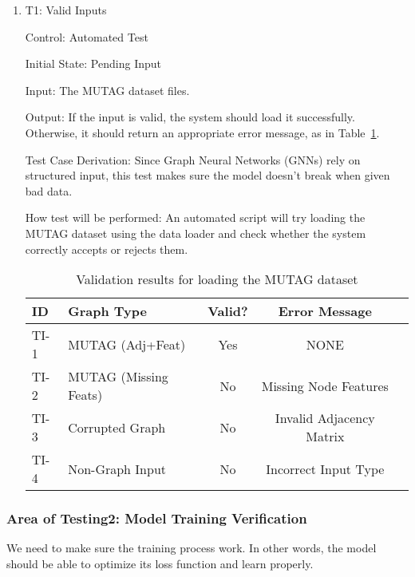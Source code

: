 \documentclass[12pt, titlepage]{article}
\begin{document}
\begin{enumerate}


\item{T1: Valid Inputs\\}

Control: Automated Test
					
Initial State: Pending Input
					
Input: The MUTAG dataset files.
					
Output:  If the input is valid, the system should load it successfully. Otherwise, it should return an appropriate error message, as in Table~\ref{tab:graph_validation}.
					
Test Case Derivation: Since Graph Neural Networks (GNNs) rely on structured input, this test makes sure the model doesn't break when given bad data.
					
How test will be performed: An automated script will try loading the MUTAG dataset using the data loader and check whether the system correctly accepts or rejects them.

\begin{table}[h]
    \centering
    \setlength{\tabcolsep}{10pt} %
    \begin{tabularx}{\linewidth}{l X c c X} 
        \toprule
        \textbf{ID} & \textbf{Graph Type} & \textbf{Valid?} & \textbf{Error Message} \\
        \midrule
        TI-1 & MUTAG (Adj+Feat) & Yes & NONE \\
        TI-2 & MUTAG (Missing Feats) & No & Missing Node Features \\
        TI-3 & Corrupted Graph & No & Invalid Adjacency Matrix \\
        TI-4 & Non-Graph Input & No & Incorrect Input Type \\
        \bottomrule
    \end{tabularx}
    \caption{Validation results for loading the MUTAG dataset}
    \label{tab:graph_validation}
\end{table}

\end{enumerate}

\subsubsection{Area of Testing2: Model Training Verification}
We need to make sure the training process work. In other words, the model should be able to optimize its loss function and learn properly.
\end{document}
